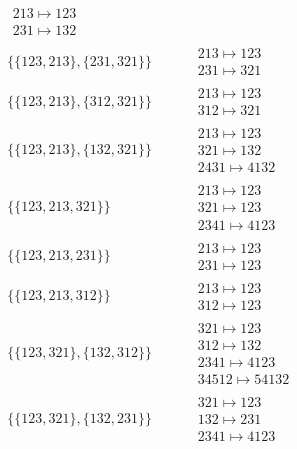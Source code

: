 \begin{tiny}
\begin{align}
\begin{matrix}
213 \mapsto 123\\231 \mapsto 132
\end{matrix}
\\
\{\{123, 213\}, \{231, 321\}\}
\quad
&
\phantom{.}
&
\begin{matrix}
213 \mapsto 123\\231 \mapsto 321
\end{matrix}
\\
\{\{123, 213\}, \{312, 321\}\}
\quad
&
\phantom{.}
&
\begin{matrix}
213 \mapsto 123\\312 \mapsto 321
\end{matrix}
\\
\{\{123, 213\}, \{132, 321\}\}
\quad
&
\phantom{.}
&
\begin{matrix}
213 \mapsto 123\\321 \mapsto 132\\2431 \mapsto 4132
\end{matrix}
\\
\{\{123, 213, 321\}\}
\quad
&
\phantom{.}
&
\begin{matrix}
213 \mapsto 123\\321 \mapsto 123\\2341 \mapsto 4123
\end{matrix}
\\
\{\{123, 213, 231\}\}
\quad
&
\phantom{.}
&
\begin{matrix}
213 \mapsto 123\\231 \mapsto 123
\end{matrix}
\\
\{\{123, 213, 312\}\}
\quad
&
\phantom{.}
&
\begin{matrix}
213 \mapsto 123\\312 \mapsto 123
\end{matrix}
\\
\{\{123, 321\}, \{132, 312\}\}
\quad
&
\phantom{.}
&
\begin{matrix}
321 \mapsto 123\\312 \mapsto 132\\2341 \mapsto 4123\\34512 \mapsto 54132
\end{matrix}
\\
\{\{123, 321\}, \{132, 231\}\}
\quad
&
\phantom{.}
&
\begin{matrix}
321 \mapsto 123\\132 \mapsto 231\\2341 \mapsto 4123
\end{matrix}

\end{align}
\end{tiny}
